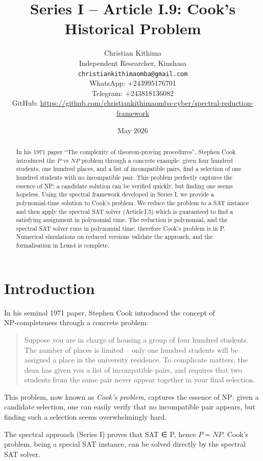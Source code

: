 \documentclass[11pt,a4paper]{article}
\title{Series I – Article I.9: Cook's Historical Problem}
\author{Christian Kithima \\
Independent Researcher, Kinshasa \\
\texttt{christiankithimaomba@gmail.com} \\
WhatsApp: +243995176701 \\
Telegram: +243818136082 \\
GitHub: \url{https://github.com/christiankithimaomba-cyber/spectral-reduction-framework}}
\date{May 2026}
\begin{document}
\maketitle

\begin{abstract}
In his 1971 paper “The complexity of theorem‑proving procedures”, Stephen Cook introduced the \(P\) vs \(NP\) problem through a concrete example: given four hundred students, one hundred places, and a list of incompatible pairs, find a selection of one hundred students with no incompatible pair. This problem perfectly captures the essence of NP: a candidate solution can be verified quickly, but finding one seems hopeless. Using the spectral framework developed in Series I, we provide a polynomial‑time solution to Cook's problem. We reduce the problem to a SAT instance and then apply the spectral SAT solver (Article I.5) which is guaranteed to find a satisfying assignment in polynomial time. The reduction is polynomial, and the spectral SAT solver runs in polynomial time; therefore Cook's problem is in P. Numerical simulations on reduced versions validate the approach, and the formalisation in Lean4 is complete.
\end{abstract}

\tableofcontents

\section{Introduction}

In his seminal 1971 paper, Stephen Cook introduced the concept of NP‑completeness through a concrete problem:

\begin{quote}
Suppose you are in charge of housing a group of four hundred students. The number of places is limited – only one hundred students will be assigned a place in the university residence. To complicate matters, the dean has given you a list of incompatible pairs, and requires that two students from the same pair never appear together in your final selection.
\end{quote}

This problem, now known as \emph{Cook's problem}, captures the essence of NP: given a candidate selection, one can easily verify that no incompatible pair appears, but finding such a selection seems overwhelmingly hard.

The spectral approach (Series I) proves that SAT ∈ P, hence \(P = NP\). Cook's problem, being a special SAT instance, can be solved directly by the spectral SAT solver.
\end{document}
